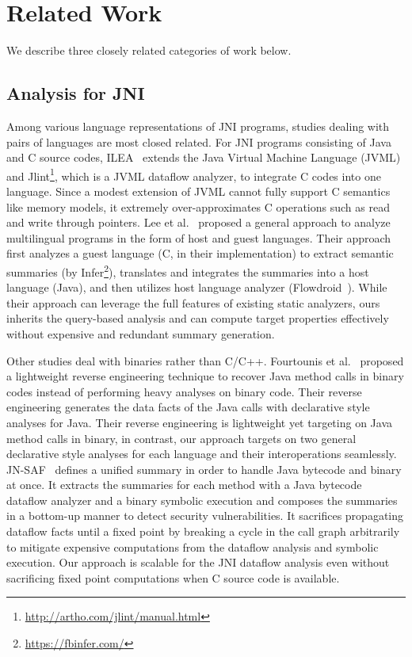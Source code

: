 \section{Related Work}\label{sec:related}
We describe three closely related categories of work below.
\subsection{Analysis for JNI}
Among various language representations of JNI programs, studies dealing with
pairs of languages are most closed related.  For JNI programs consisting of
Java and C source codes, ILEA~\cite{ILEA} extends the Java Virtual Machine
Language (JVML) and Jlint\footnote{\url{http://artho.com/jlint/manual.html}},
which is a JVML dataflow analyzer, to integrate C codes into one language.
Since a modest extension of JVML cannot fully support C semantics like memory
models, it extremely over-approximates C operations such as read and write
through pointers.  Lee et al.~\cite{LeeASE20} proposed a general approach to
analyze multilingual programs in the form of host and guest languages.  Their
approach first analyzes a guest language (C, in their implementation) to extract
semantic summaries (by Infer\footnote{\url{https://fbinfer.com/}}), translates
and integrates the summaries into a host language (Java), and then utilizes host
language analyzer (Flowdroid~\cite{Flowdroid}).  While their approach can
leverage the full features of existing static analyzers, ours inherits the
query-based analysis and can compute target properties effectively without
expensive and redundant summary generation.

Other studies deal with binaries rather than C/C++.
Fourtounis et al.~\cite{scanning} proposed a lightweight reverse engineering
technique to recover Java method calls in binary codes instead of performing
heavy analyses on binary code.  Their reverse engineering generates the data
facts of the Java calls with declarative style analyses for Java.
Their reverse engineering is lightweight yet targeting on Java method calls in
binary, in contrast, our approach targets on two general declarative style
analyses for each language and their interoperations seamlessly.
JN-SAF~\cite{JN-SAF} defines a unified summary in order to handle Java bytecode
and binary at once.  It extracts the summaries for each method with a Java
bytecode dataflow analyzer and a binary symbolic execution and composes the
summaries in a bottom-up manner to detect security vulnerabilities.
It sacrifices propagating dataflow facts until a fixed point by breaking a cycle
in the call graph arbitrarily to mitigate expensive computations from the
dataflow analysis and symbolic execution.  Our approach is scalable for the JNI
dataflow analysis even without sacrificing fixed point computations when C
source code is available.

